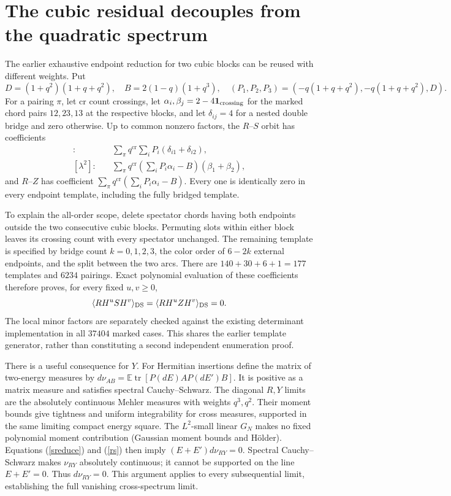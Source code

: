 \documentclass[11pt,a4paper]{article}
\newcommand{\E}{\mathbb E}
\newcommand{\tr}{\operatorname{tr}}
\newcommand{\av}[1]{\langle #1\rangle}
\begin{document}
\newpage
\section{The cubic residual decouples from the quadratic spectrum}
The earlier exhaustive endpoint reduction for two cubic blocks can
be reused with different weights. Put
\[
 D=(1+q^2)(1+q+q^2),\quad B=2(1-q)(1+q^3),
 \quad(P_1,P_2,P_3)=(-q(1+q+q^2),-q(1+q+q^2),D).
\]
For a pairing $\pi$, let $\mathrm{cr}$ count crossings, let
$\alpha_i,\beta_j=2-4\mathbf1_{\rm crossing}$ for the marked
chord pairs $12,23,13$ at the respective blocks, and let
$\delta_{ij}=4$ for a nested double bridge and zero otherwise.
Up to common nonzero factors, the $R$--$S$ orbit has coefficients
\begin{align}
 [\lambda]:&\quad\sum_\pi q^{\mathrm{cr}}
                   \sum_i P_i(\delta_{i1}+\delta_{i2}),\\
 [\lambda^2]:&\quad\sum_\pi q^{\mathrm{cr}}
              (\textstyle\sum_iP_i\alpha_i-B)(\beta_1+\beta_2),
\end{align}
and $R$--$Z$ has coefficient
$\sum_\pi q^{\mathrm{cr}}(\sum_iP_i\alpha_i-B)$.
Every one is identically zero in every endpoint template,
including the fully bridged template.

To explain the all-order scope, delete spectator chords having both
endpoints outside the two consecutive cubic blocks. Permuting slots
within either block leaves its crossing count with every spectator
unchanged. The remaining template is specified by bridge count
$k=0,1,2,3$, the color order of $6-2k$ external endpoints, and the
split between the two arcs. There are $140+30+6+1=177$ templates
and $6234$ pairings. Exact polynomial evaluation of these coefficients
therefore proves, for every fixed $u,v\geq0$,
\begin{equation}
 \av{RH^uSH^v}_{\rm DS}=\av{RH^uZH^v}_{\rm DS}=0.\label{rs}
\end{equation}
The local minor factors are separately checked against the existing
determinant implementation in all $37404$ marked cases. This shares
the earlier template generator, rather than constituting a second
independent enumeration proof.

There is a useful consequence for $Y$. For Hermitian insertions
define the matrix of two-energy measures by
$d\nu_{AB}=\E\tr[P(dE)A P(dE')B]$. It is positive as a matrix
measure and satisfies spectral Cauchy--Schwarz. The diagonal $R,Y$
limits are the absolutely continuous Mehler measures with weights
$q^3,q^2$. Their moment bounds give tightness and uniform
integrability for cross measures, supported in the same limiting
compact energy square. The $L^2$-small linear $G_N$ makes no fixed
polynomial moment contribution (Gaussian moment bounds and H\"older).
Equations (\ref{sreduce}) and (\ref{rs}) then imply
$(E+E')d\nu_{RY}=0$. Spectral Cauchy--Schwarz makes $\nu_{RY}$
absolutely continuous; it cannot be supported on the line $E+E'=0$.
Thus $\boxed{d\nu_{RY}=0}$. This argument applies to every subsequential
limit, establishing the full vanishing cross-spectrum limit.
\end{document}
